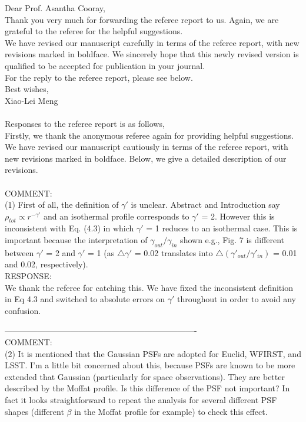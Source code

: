 \documentclass[a4paper,11pt]{article}
\begin{document}
Dear Prof. Asantha Cooray,
\\

Thank you very much for forwarding the referee report to us. Again, we are grateful to the referee for the helpful suggestions.
\\

We have revised our manuscript carefully in terms of the referee report, with new revisions marked in boldface. We sincerely hope that this newly revised version is qualified to be accepted for publication in your journal.
\\

For the reply to the referee report, please see below.
\\

Best wishes,
\\

Xiao-Lei Meng
\\
\\

Responses to the referee report is as follows,
\\

Firstly, we thank the anonymous referee again for providing helpful suggestions. We have revised our manuscript cautiously in terms of the referee report, with new revisions marked in boldface. Below, we give a detailed description of our revisions.
\\
\\
COMMENT:
\\
(1) First of all, the definition of $\gamma'$ is unclear. Abstract and Introduction say $\rho_{tot} \propto r^{-\gamma'}$ and an isothermal profile corresponds to $\gamma'$ = 2. However this is inconsistent with Eq. (4.3) in which $\gamma'$ = 1 reduces to an isothermal case. This is important because the  interpretation of $\gamma_{out}/\gamma_{in}$ shown e.g., Fig. 7 is different between $\gamma'$ = 2 and $\gamma'$ = 1 (as $\bigtriangleup \gamma'$ = 0.02 translates into $\bigtriangleup (\gamma'_{out}/\gamma'_{in})$ = 0.01 and 0.02, respectively).
\\

RESPONSE:
\\
We thank the referee for catching this. We have fixed the inconsistent
definition in Eq 4.3 and switched to absolute errors on $\gamma'$
throughout in order to avoid any confusion.

----------------------------------------------------------------------
\\
COMMENT:
\\
(2) It is mentioned that the Gaussian PSFs are adopted for Euclid,
WFIRST, and LSST. I'm a little bit concerned about this, because PSFs
are known to be more extended that Gaussian (particularly for space
observations). They are better described by the Moffat profile. Is
this difference of the PSF not important? In fact it looks
straightforward to repeat the analysis for several different PSF
shapes (different $\beta$ in the Moffat profile for example) to check
this effect.
\\
\end{document}
